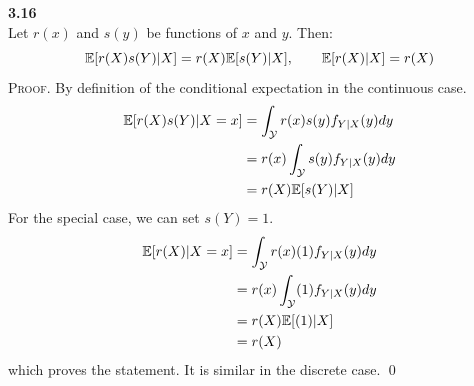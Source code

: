 \bigskip\noindent
\textbf{3.16}\\  %
Let $r(x)$ and $s(y)$ be functions of $x$ and $y$. Then:
$$
\mathbb{E}[r(X)s(Y)|X] = r(X)\mathbb{E}[s(Y)|X], \qquad \mathbb{E}[r(X)|X] = r(X)
$$
\textsc{Proof}. By definition of the conditional expectation in the continuous case.
\begin{align*}
    \mathbb{E}[r(X)s(Y)|X=x] &= \int_{\mathcal{Y}} r(x)s(y)f_{Y|X}(y) dy \\
    &= r(x)\int_{\mathcal{Y}} s(y)f_{Y|X}(y) dy \\
    &= r(X)\mathbb{E}[s(Y)|X]
\end{align*}
For the special case, we can set $s(Y) = 1$.
\begin{align*}
    \mathbb{E}[r(X)|X=x] &= \int_{\mathcal{Y}} r(x)(1)f_{Y|X}(y) dy \\
    &= r(x)\int_{\mathcal{Y}} (1)f_{Y|X}(y) dy \\
    &= r(X)\mathbb{E}[(1)|X] \\
    &= r(X)
\end{align*}
which proves the statement. It is similar in the discrete case. \qed

